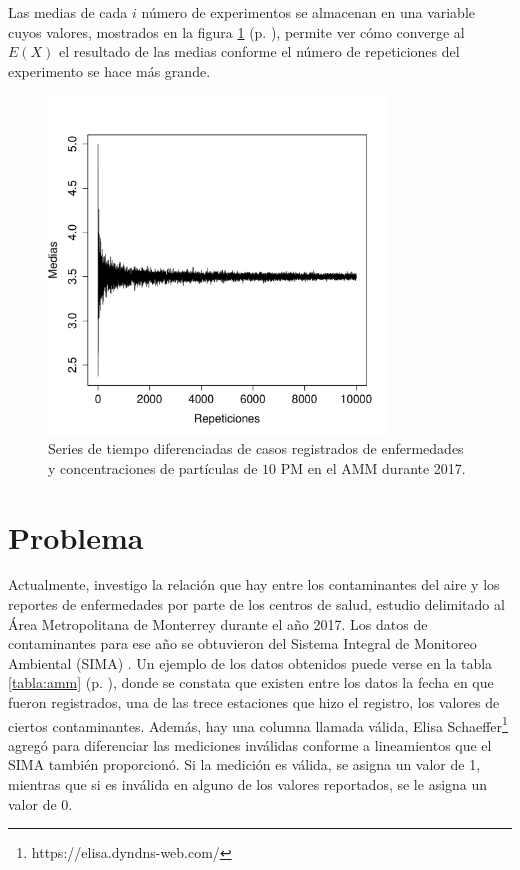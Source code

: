 \documentclass[paper=leter, fontsize=11pt]{scrartcl}
\begin{document}
Las medias de cada $i$ número de experimentos se almacenan en una variable cuyos valores, mostrados en la figura \ref{fig:dados} (p. \pageref{fig:dados}), permite ver cómo converge al $E(X)$ el resultado de las medias conforme el número de repeticiones del experimento se hace más grande.

\begin{figure}
  \centering
  \includegraphics[width=0.8\textwidth]{dados.pdf}
\caption{Series de tiempo diferenciadas de casos registrados de enfermedades y concentraciones de partículas de $10$ PM en el AMM durante 2017.}
\label{fig:dados}
\end{figure}

\section{Problema}

Actualmente, investigo la relación que hay entre los contaminantes del aire y los reportes de enfermedades por parte de los centros de salud, estudio delimitado al Área Metropolitana de Monterrey durante el año 2017. Los datos de contaminantes para ese año se obtuvieron del Sistema Integral de Monitoreo Ambiental (SIMA) \cite{aireNL}. Un ejemplo de los datos obtenidos puede verse en la tabla \ref{tabla:amm} (p. \pageref{tabla:amm}), donde se constata que existen entre los datos la fecha en que fueron registrados, una de las trece estaciones que hizo el registro, los valores de ciertos contaminantes. Además, hay una columna llamada válida, Elisa Schaeffer\footnote{https://elisa.dyndns-web.com/} agregó para diferenciar las mediciones inválidas conforme a lineamientos que el SIMA también proporcionó. Si la medición es válida, se asigna un valor de 1, mientras que si es inválida en alguno de los valores reportados, se le asigna un valor de 0.
\end{document}

